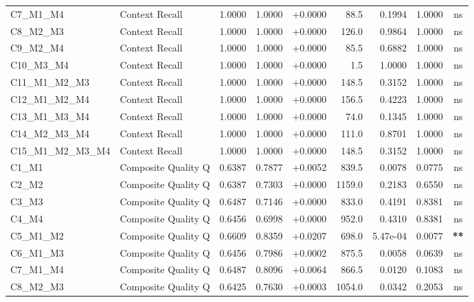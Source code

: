 \begin{table}[p]
\begin{tabular*}{\textwidth}{@{\extracolsep{\fill}} l l r r r r r r c @{}}
\addlinespace
C7\_M1\_M4      & Context Recall       & 1.0000 & 1.0000 & +0.0000 & 88.5 & 0.1994 & 1.0000 & ns \\
\addlinespace
C8\_M2\_M3      & Context Recall       & 1.0000 & 1.0000 & +0.0000 & 126.0 & 0.9864 & 1.0000 & ns \\
\addlinespace
C9\_M2\_M4      & Context Recall       & 1.0000 & 1.0000 & +0.0000 & 85.5 & 0.6882 & 1.0000 & ns \\
\addlinespace
C10\_M3\_M4     & Context Recall       & 1.0000 & 1.0000 & +0.0000 & 1.5 & 1.0000 & 1.0000 & ns \\
\addlinespace
C11\_M1\_M2\_M3 & Context Recall       & 1.0000 & 1.0000 & +0.0000 & 148.5 & 0.3152 & 1.0000 & ns \\
\addlinespace
C12\_M1\_M2\_M4 & Context Recall       & 1.0000 & 1.0000 & +0.0000 & 156.5 & 0.4223 & 1.0000 & ns \\
\addlinespace
C13\_M1\_M3\_M4 & Context Recall       & 1.0000 & 1.0000 & +0.0000 & 74.0 & 0.1345 & 1.0000 & ns \\
\addlinespace
C14\_M2\_M3\_M4 & Context Recall       & 1.0000 & 1.0000 & +0.0000 & 111.0 & 0.8701 & 1.0000 & ns \\
\addlinespace
C15\_M1\_M2\_M3\_M4 & Context Recall       & 1.0000 & 1.0000 & +0.0000 & 148.5 & 0.3152 & 1.0000 & ns \\
\addlinespace
C1\_M1          & Composite Quality Q  & 0.6387 & 0.7877 & +0.0052 & 839.5 & 0.0078 & 0.0775 & ns \\
\addlinespace
C2\_M2          & Composite Quality Q  & 0.6387 & 0.7303 & +0.0000 & 1159.0 & 0.2183 & 0.6550 & ns \\
\addlinespace
C3\_M3          & Composite Quality Q  & 0.6487 & 0.7146 & +0.0000 & 833.0 & 0.4191 & 0.8381 & ns \\
\addlinespace
C4\_M4          & Composite Quality Q  & 0.6456 & 0.6998 & +0.0000 & 952.0 & 0.4310 & 0.8381 & ns \\
\addlinespace
C5\_M1\_M2      & Composite Quality Q  & 0.6609 & 0.8359 & +0.0207 & 698.0 & 5.47e-04 & 0.0077 & \textbf{**} \\
\addlinespace
C6\_M1\_M3      & Composite Quality Q  & 0.6456 & 0.7986 & +0.0002 & 875.5 & 0.0058 & 0.0639 & ns \\
\addlinespace
C7\_M1\_M4      & Composite Quality Q  & 0.6487 & 0.8096 & +0.0064 & 866.5 & 0.0120 & 0.1083 & ns \\
\addlinespace
C8\_M2\_M3      & Composite Quality Q  & 0.6425 & 0.7630 & +0.0003 & 1054.0 & 0.0342 & 0.2053 & ns \\

\end{tabular*}
\end{table}
